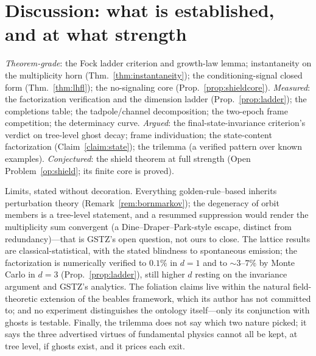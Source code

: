 \documentclass[11pt]{article}
\theoremstyle{definition}
\theoremstyle{remark}
\begin{document}
\section{Discussion: what is established, and at what strength}
\label{sec:discussion}

\emph{Theorem-grade}: the Fock ladder criterion and growth-law lemma;
instantaneity on the multiplicity horn
(Thm.~\ref{thm:instantaneity}); the conditioning-signal closed form
(Thm.~\ref{thm:lhfl}); the no-signaling core
(Prop.~\ref{prop:shieldcore}). \emph{Measured}: the factorization verification and the dimension ladder (Prop.~\ref{prop:ladder}); the completions table; the
tadpole/channel decomposition; the two-epoch frame competition; the
determinacy curve. \emph{Argued}: the final-state-invariance
criterion's verdict on tree-level ghost decay; frame individuation;
the state-content factorization (Claim~\ref{claim:state});
the trilemma (a verified pattern over known examples).
\emph{Conjectured}: the shield theorem at full strength (Open
Problem~\ref{op:shield}; its finite core is proved).

Limits, stated without decoration. Everything golden-rule--based
inherits perturbation theory (Remark~\ref{rem:bornmarkov}); the
degeneracy of orbit members is a tree-level statement, and a
resummed suppression would render the multiplicity sum convergent
(a Dine--Draper--Park-style escape, distinct from redundancy)---that
is GSTZ's open question, not ours to close. The lattice
results are classical-statistical, with the stated blindness to
spontaneous emission; the factorization is numerically verified to
$0.1\%$ in $d=1$ and to ${\sim}3$--$7\%$ by Monte Carlo in $d=3$
(Prop.~\ref{prop:ladder}), still higher $d$ resting on the invariance
argument and GSTZ's analytics. The foliation claims live within the natural
field-theoretic extension of the beables framework, which its author
has not committed to; and no experiment distinguishes the ontology
itself---only its conjunction with ghosts is testable. Finally, the
trilemma does not say which two nature picked; it says the three
advertised virtues of fundamental physics cannot all be kept, at tree
level, if ghosts exist, and it prices each exit.
\end{document}
